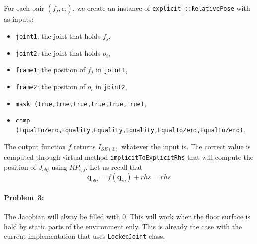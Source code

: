 \documentclass {article}
\newcommand\conf{\mathbf{q}}
\begin{document}
For each pair $(f_j, o_i)$, we create an instance of \texttt{explicit\_::RelativePose} with as inputs:
\begin{itemize}
  \item \texttt{joint1}: the joint that holds $f_j$,
  \item \texttt{joint2}: the joint that holds $o_i$,
  \item \texttt{frame1}: the position of $f_j$ in \texttt{joint1},
  \item \texttt{frame2}: the position of $o_i$ in \texttt{joint2},
  \item \texttt{mask}: \texttt{(true,true,true,true,true,true)},
  \item \texttt{comp}: \texttt{(EqualToZero,Equality,Equality,Equality,EqualToZero,EqualToZero)}.
\end{itemize}

The output function $f$ returns $I_{SE(3)}$ whatever the input is. The correct
value is computed through virtual method \texttt{implicitToExplicitRhs} that
will compute the position of $J_{obj}$ using $RP_{i,j}$. Let us recall that
$$
\conf_{obj} = f(\conf_{in}) + rhs = rhs
$$

\paragraph{Problem~3:} The Jacobian will alway be filled with 0. This will work
when the floor surface is hold by static parts of the environment only. This is
already the case with the current implementation that uses \texttt{LockedJoint}
class.
\end{document}
